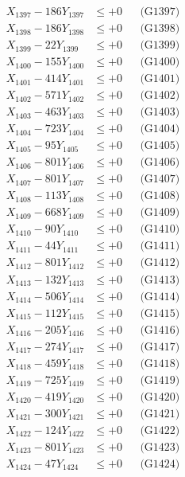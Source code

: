 \documentclass[a4paper,10pt]{article}
\begin{document}
{\begin{align}
X_{1397} - 186Y_{1397} &\leq +0 && \text{(G1397)} \\
X_{1398} - 186Y_{1398} &\leq +0 && \text{(G1398)} \\
X_{1399} - 22Y_{1399} &\leq +0 && \text{(G1399)} \\
X_{1400} - 155Y_{1400} &\leq +0 && \text{(G1400)} \\
\allowbreak
X_{1401} - 414Y_{1401} &\leq +0 && \text{(G1401)} \\
X_{1402} - 571Y_{1402} &\leq +0 && \text{(G1402)} \\
X_{1403} - 463Y_{1403} &\leq +0 && \text{(G1403)} \\
X_{1404} - 723Y_{1404} &\leq +0 && \text{(G1404)} \\
X_{1405} - 95Y_{1405} &\leq +0 && \text{(G1405)} \\
X_{1406} - 801Y_{1406} &\leq +0 && \text{(G1406)} \\
X_{1407} - 801Y_{1407} &\leq +0 && \text{(G1407)} \\
X_{1408} - 113Y_{1408} &\leq +0 && \text{(G1408)} \\
X_{1409} - 668Y_{1409} &\leq +0 && \text{(G1409)} \\
X_{1410} - 90Y_{1410} &\leq +0 && \text{(G1410)} \\
\allowbreak
X_{1411} - 44Y_{1411} &\leq +0 && \text{(G1411)} \\
X_{1412} - 801Y_{1412} &\leq +0 && \text{(G1412)} \\
X_{1413} - 132Y_{1413} &\leq +0 && \text{(G1413)} \\
X_{1414} - 506Y_{1414} &\leq +0 && \text{(G1414)} \\
X_{1415} - 112Y_{1415} &\leq +0 && \text{(G1415)} \\
X_{1416} - 205Y_{1416} &\leq +0 && \text{(G1416)} \\
X_{1417} - 274Y_{1417} &\leq +0 && \text{(G1417)} \\
X_{1418} - 459Y_{1418} &\leq +0 && \text{(G1418)} \\
X_{1419} - 725Y_{1419} &\leq +0 && \text{(G1419)} \\
X_{1420} - 419Y_{1420} &\leq +0 && \text{(G1420)} \\
\allowbreak
X_{1421} - 300Y_{1421} &\leq +0 && \text{(G1421)} \\
X_{1422} - 124Y_{1422} &\leq +0 && \text{(G1422)} \\
X_{1423} - 801Y_{1423} &\leq +0 && \text{(G1423)} \\
X_{1424} - 47Y_{1424} &\leq +0 && \text{(G1424)} \\

\end{align}}
\end{document}
